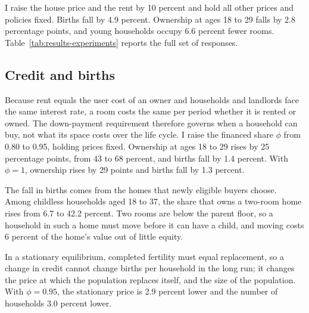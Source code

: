 I raise the house price and the rent by 10 percent and hold all other prices
and policies fixed. Births fall by 4.9 percent. Ownership at ages 18 to 29
falls by 2.8 percentage points, and young households occupy 6.6 percent fewer
rooms. Table~\ref{tab:results-experiments} reports the full set of
responses.

\subsection{Credit and births}
\label{sec:results-credit}

Because rent equals the user cost of an owner and households and landlords
face the same interest rate, a room costs the same per period whether it is
rented or owned. The down-payment requirement therefore governs when a
household can buy, not what its space costs over the life cycle. I raise the
financed share $\phi$ from 0.80 to 0.95, holding prices fixed. Ownership at
ages 18 to 29 rises by 25 percentage points, from 43 to 68 percent, and
births fall by 1.4 percent. With $\phi=1$, ownership rises by 29 points and
births fall by 1.3 percent.

The fall in births comes from the homes that newly eligible buyers choose.
Among childless households aged 18 to 37, the share that owns a two-room home
rises from 6.7 to 42.2 percent. Two rooms are below the parent floor, so a
household in such a home must move before it can have a child, and moving
costs 6 percent of the home's value out of little equity.

In a stationary equilibrium, completed fertility must equal replacement, so a
change in credit cannot change births per household in the long run; it
changes the price at which the population replaces itself, and the size of the
population. With $\phi=0.95$, the stationary price is 2.9 percent lower and
the number of households 3.0 percent lower.

